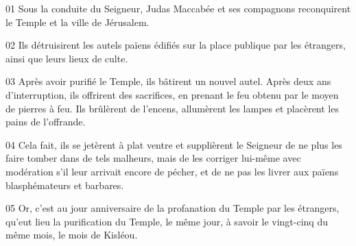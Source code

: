 01 Sous la conduite du Seigneur, Judas Maccabée et ses compagnons reconquirent le Temple et la ville de Jérusalem.

02 Ils détruisirent les autels païens édifiés sur la place publique par les étrangers, ainsi que leurs lieux de culte.

03 Après avoir purifié le Temple, ils bâtirent un nouvel autel. Après deux ans d’interruption, ils offrirent des sacrifices, en prenant le feu obtenu par le moyen de pierres à feu. Ils brûlèrent de l’encens, allumèrent les lampes et placèrent les pains de l’offrande.

04 Cela fait, ils se jetèrent à plat ventre et supplièrent le Seigneur de ne plus les faire tomber dans de tels malheurs, mais de les corriger lui-même avec modération s’il leur arrivait encore de pécher, et de ne pas les livrer aux païens blasphémateurs et barbares.

05 Or, c’est au jour anniversaire de la profanation du Temple par les étrangers, qu’eut lieu la purification du Temple, le même jour, à savoir le vingt-cinq du même mois, le mois de Kisléou.